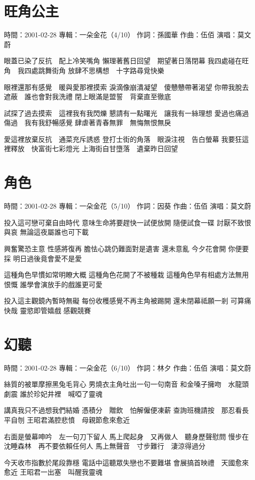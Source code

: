 \documentclass[UTF8,a4paper,oneside,twocolumn,12pt]{ctexbook}
\newcommand{\infopair}[2]{\textbullet #1：#2}
\newcommand{\zc}[1][伍佰]{\infopair{作詞}{#1}}
\newcommand{\zq}[1][伍佰]{\infopair{作曲}{#1}}
\newcommand{\zj}[1]{\infopair{專輯}{#1}}
\newcommand{\sj}[1]{\infopair{時間}{#1}}
\newenvironment{info}{\begin{flushleft}\kaishu
	}
	{\end{flushleft}\normalsize\yahei\par}
\newenvironment{lyric}{
	}
{}
\begin{document}
\section{旺角公主}
\begin{info}
	\sj{2001-02-28}
	\zj{一朵金花（4/10）}
	\zc[孫國華]
	\zq
	\infopair{演唱}{莫文蔚}
\end{info}
\begin{lyric}
	眼蓋已染了反抗　配上冷笑嘴角
	懶理著舊日回望　期望著日落閉幕
	我四處碰在旺角　我四處跳舞街角
	放肆不思構想　十字路尋覓快樂

	眼裡還那有感覺　暖與愛那裡摸索
	淚滴像崩潰凝望　傻戇戇帶著渴望
	你帶我脫去遮蔽　誰也會對我洗禮
	閉上眼滿是盟誓　背棄直至徹底

	試探了過去摸索　這裡我有我閃爍
	懇請有一點曙光　讓我有一絲理想
	愛過也痛過傷過　我有我舒暢感覺
	肆虐著青春無罪　無悔無恨無戾

	愛這裡放棄反抗　通菜充斥誘惑
	登打士街的角落　眼淚注視　告白螢幕
	我要狂這裡釋放　快富街七彩燈光
	上海街自甘墮落　遺棄昨日回望
\end{lyric}

\section{角色}
\begin{info}
	\sj{2001-02-28}
	\zj{一朵金花（5/10）}
	\zc[因葵]
	\zq
	\infopair{演唱}{莫文蔚}
\end{info}
\begin{lyric}
	投入這可戀可棄自由時代
	意味生命將要趕快一試便放開
	隨便試食一碟 討厭不致恨與哀
	無論這夜屬誰也可下載

	興奮驚恐主意 性感將復再
	膽怯心跳仍難面對是遺害
	還未意亂 今夕花會開 你便要採
	明日過後竟會愛不是愛

	這種角色早慣如常明瞭大概
	這種角色花開了不被種栽
	這種角色早有相處方法無用恨慨
	誰學會演放手的戲誰更可愛

	投入這主觀鏡內暫時無礙
	每份收穫感覺不再主角被踢開
	還未閉幕祗願一剎 可算痛快哉
	靈慾即管嬉戲 感觀競賽
\end{lyric}

\section{幻聽}
\begin{info}
	\sj{2001-02-28}
	\zj{一朵金花（6/10）}
	\zc[林夕]
	\zq
	\infopair{演唱}{莫文蔚}
\end{info}
\begin{lyric}
	絲質的被單摩擦黑兔毛背心
	男燒衣主角吐出一句一句南音
	和金嗓子擁吻　水龍頭劇震
	誰於珍妃井裡　喊啞了靈魂

	講真我只不過想我們結婚
	憑積分　贈飲　怕解僱便凍薪
	查詢班機請按　那忍看長平自刎
	王昭君滿腔悲憤　母親節愈來愈近

	右面是螢幕呻吟　左一句刀下留人
	馬上爬起身　又再做人　聽身歷聲慰問
	慢步在沈睡森林　再不要依賴任何人
	馬上無聲音　寸步難行　淒涼得過分

	今天收市指數於尾段靠穩
	電話中這聽眾失戀也不要難堪
	會展搞首映禮　天國愈來愈近
	王昭君一出塞　叫醒我靈魂
\end{lyric}
\end{document}
